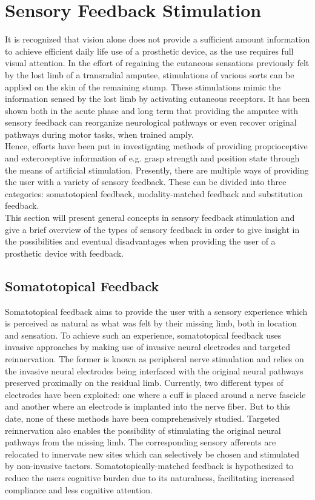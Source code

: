 \section{Sensory Feedback Stimulation} \label{SFS}

It is recognized that vision alone does not provide a sufficient amount information to achieve efficient daily life use of a prosthetic device, as the use requires full visual attention. In the effort of regaining the cutaneous sensations previously felt by the lost limb of a transradial amputee, stimulations of various sorts can be applied on the skin of the remaining stump. These stimulations mimic the information sensed by the lost limb by activating cutaneous receptors. It has been shown both in the acute phase and long term that providing the amputee with sensory feedback can reorganize neurological pathways or even recover original pathways during motor tasks, when trained amply. \cite{Pino2009} \\
Hence, efforts have been put in investigating methods of providing proprioceptive and exteroceptive information of e.g. grasp strength and position state through the means of artificial stimulation. \cite{Schofield2014,Stephens-Fripp2018} Presently, there are multiple ways of providing the user with a variety of sensory feedback. These can be divided into three categories: somatotopical feedback, modality-matched feedback and substitution feedback. \cite{Schofield2014} \\
This section will present general concepts in sensory feedback stimulation and give a brief overview of the types of sensory feedback in order to give insight in the possibilities and eventual disadvantages when providing the user of a prosthetic device with feedback.

\subsection{Somatotopical Feedback}

Somatotopical feedback aims to provide the user with a sensory experience which is perceived as natural as what was felt by their missing limb, both in location and sensation. To achieve such an experience, somatotopical feedback uses invasive approaches by making use of invasive neural electrodes and targeted reinnervation. The former is known as peripheral nerve stimulation and relies on the invasive neural electrodes being interfaced with the original neural pathways preserved proximally on the residual limb. Currently, two different types of electrodes have been exploited: one where a cuff is placed around a nerve fascicle and another where an electrode is implanted into the nerve fiber. But to this date, none of these methods have been comprehensively studied. Targeted reinnervation also enables the possibility of stimulating the original neural pathways from the missing limb. The corresponding sensory afferents are relocated to innervate new sites which can selectively be chosen and stimulated by non-invasive tactors. Somatotopically-matched feedback is hypothesized to reduce the users cognitive burden due to its naturalness, facilitating increased compliance and less cognitive attention. \cite{Schofield2014}  


